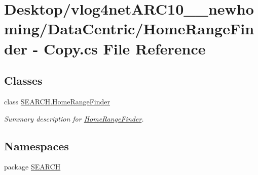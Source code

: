 \hypertarget{_home_range_finder_01-_01_copy_8cs}{\section{Desktop/vlog4net\-A\-R\-C10\-\_\-\_\-newhoming/\-Data\-Centric/\-Home\-Range\-Finder -\/ Copy.\-cs File Reference}
\label{_home_range_finder_01-_01_copy_8cs}
}
\subsection*{Classes}
\begin{DoxyCompactItemize}
\item 
class \hyperlink{class_s_e_a_r_c_h_1_1_home_range_finder}{S\-E\-A\-R\-C\-H.\-Home\-Range\-Finder}
\begin{DoxyCompactList}\small\item\em Summary description for \hyperlink{class_s_e_a_r_c_h_1_1_home_range_finder}{Home\-Range\-Finder}. \end{DoxyCompactList}\end{DoxyCompactItemize}
\subsection*{Namespaces}
\begin{DoxyCompactItemize}
\item 
package \hyperlink{namespace_s_e_a_r_c_h}{S\-E\-A\-R\-C\-H}
\end{DoxyCompactItemize}
